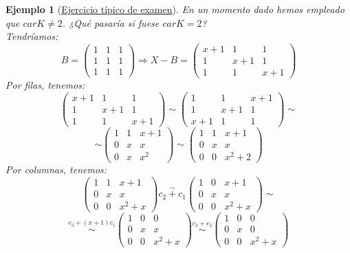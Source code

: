 \documentclass[11pt,a4paper]{article}
\theoremstyle{break}
\newtheorem{example}[theorem]{Ejemplo}
\begin{document}
\begin{example}[\underline{Ejercicio típico de examen}]
En un momento dado hemos empleado que $carK \neq 2$. ¿Qué pasaría si fuese $carK = 2$? \\
Tendríamos:
$$B = \begin{pmatrix}
1 & 1 & 1 \\
1 & 1 & 1 \\
1 & 1 & 1
\end{pmatrix} \Rightarrow X - B = \begin{pmatrix}
x+1 & 1 & 1 \\
1 & x+1 & 1 \\
1 & 1 & x+1
\end{pmatrix}$$
Por filas, tenemos:
$$\begin{pmatrix}
x+1 & 1 & 1 \\
1 & x+1 & 1 \\
1 & 1 & x+1
\end{pmatrix} \sim \begin{pmatrix}
1 & 1 & x+1 \\
1 & x+1 & 1 \\
x+1 & 1 & 1
\end{pmatrix} \sim$$
$$\sim \begin{pmatrix}
1 & 1 & x+1 \\
0 & x & x \\
0 & x & x^{2}
\end{pmatrix} \sim \begin{pmatrix}
1 & 1 & x+1 \\
0 & x & x \\
0 & 0 & x^{2}+2
\end{pmatrix}$$
Por columnas, tenemos:
$$\begin{pmatrix}
1 & 1 & x+1 \\
0 & x & x \\
0 & 0 & x^{2} + x
\end{pmatrix} \overset{\sim}{c_{2}+c_{1}} \begin{pmatrix}
1 & 0 & x+1 \\
0 & x & x \\
0 & 0 & x^{2}+x
\end{pmatrix} \sim$$
$$\overset{c_{3} + (x+1)c_{1}}{\sim} \begin{pmatrix}
1 & 0 & 0 \\
0 & x & x \\
0 & 0 & x^{2}+x
\end{pmatrix} \overset{c_{3}+c_{2}}{\sim} \begin{pmatrix}
1 & 0 & 0 \\
0 & x & 0 \\
0 & 0 & x^{2}+x

\end{pmatrix}$$
\end{example}
\end{document}
